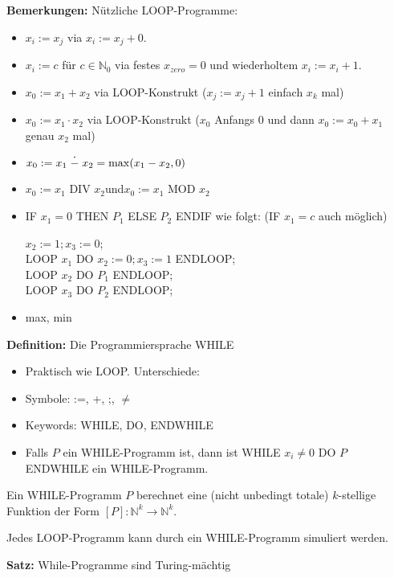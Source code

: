 \documentclass[a4paper,graphics,11pt]{article}
\newcommand{\up}[2]{\mathrel{\overset{\makebox[0pt]{\mbox{\normalfont\tiny #2}}}{#1}}}
\begin{document}
\textbf{Bemerkungen:} Nützliche LOOP-Programme:
\begin{itemize}
    \item $x_i := x_j$ via $x_i := x_j + 0$.
    \item $x_i := c$ für $c \in \mathbb{N}_0$ via festes $x_{zero} = 0$ und wiederholtem $x_i := x_i + 1$.
    \item $x_0 := x_1 + x_2$ via LOOP-Konstrukt ($x_j := x_j + 1$ einfach $x_k$ mal)
    \item $x_0 := x_1 \cdot x_2$ via LOOP-Konstrukt ($x_0$ Anfangs 0 und dann $x_0 := x_0 + x_1$ genau $x_2$ mal)
    \item $x_0 := x_1 \up{-}{\large.} x_2 = \max(x_1-x_2,0)$
    \item $x_0 := x_1 \text{ DIV } x_2$\quad und\quad $x_0 := x_1 \text{ MOD } x_2$
    \item IF $x_1 = 0$ THEN $P_1$ ELSE $P_2$ ENDIF wie folgt: (IF $x_1 = c$ auch möglich)

        $x_2 := 1; x_3 := 0$;\\
        LOOP $x_1$ DO $x_2 := 0;x_3 := 1$ ENDLOOP;\\
        LOOP $x_2$ DO $P_1$ ENDLOOP;\\
        LOOP $x_3$ DO $P_2$ ENDLOOP;\\
    \item max, min
\end{itemize}

\newpage

\textbf{Definition:} Die Programmiersprache WHILE
\begin{itemize}
    \item Praktisch wie LOOP. Unterschiede:
    \item Symbole: :=, +, ;, {\color{red}$\neq$}
    \item Keywords: WHILE, DO, ENDWHILE
    \\
    \item Falls $P$ ein WHILE-Programm ist, dann ist WHILE $x_i \neq 0$ DO $P$ ENDWHILE ein WHILE-Programm.
\end{itemize}

Ein WHILE-Programm $P$ berechnet eine (nicht unbedingt totale) $k$-stellige Funktion der Form
$[P] : \mathbb{N}^k \to \mathbb{N}^k$.

Jedes LOOP-Programm kann durch ein WHILE-Programm simuliert werden.

\strut

\textbf{Satz:} While-Programme sind Turing-mächtig
\end{document}
